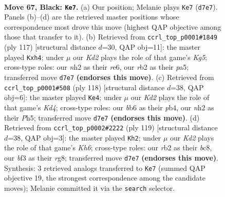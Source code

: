 \documentclass[11pt]{article}
\begin{document}
\clearpage

\begin{figure}[p]\centering
\begin{subfigure}{0.46\textwidth}\centering
\resizebox{\linewidth}{!}{%
\newchessgame
\chessboard[
  setfen={8/3k4/1B2b3/2K5/P7/1P3Brp/1R5N/8 b - - 13 67},
  showmover=false,
  pgfstyle=straightmove, color=movearrow, markmove={d7-e7}
]}
\caption{}
\end{subfigure}\hfill
\begin{subfigure}{0.46\textwidth}\centering
\resizebox{\linewidth}{!}{%
\newchessgame
\chessboard[
  setfen={8/1p6/4R3/P1K5/2P3kP/1r2Bb2/8/8 b - - 0 59},
  showmover=false,
  pgfstyle=straightmove, color=movearrow, markmove={g4-h4}
]}
\caption{}
\end{subfigure}
\\[4pt]
\begin{subfigure}{0.46\textwidth}\centering
\resizebox{\linewidth}{!}{%
\newchessgame
\chessboard[
  setfen={8/4bkp1/1R5p/4B2P/1p1K4/6P1/8/5r2 w - - 1 60},
  showmover=false,
  pgfstyle=straightmove, color=movearrow, markmove={d4-e4}
]}
\caption{}
\end{subfigure}\hfill
\begin{subfigure}{0.46\textwidth}\centering
\resizebox{\linewidth}{!}{%
\newchessgame
\chessboard[
  setfen={2B3R1/8/5p2/4b3/7p/1KP4k/1P3r2/8 b - - 1 60},
  showmover=false,
  pgfstyle=straightmove, color=movearrow, markmove={h3-h2}
]}
\caption{}
\end{subfigure}
\caption{\textbf{Move 67, Black: \texttt{Ke7}.} (a) Our position; Melanie plays \texttt{Ke7} (\texttt{d7e7}). Panels (b)--(d) are the retrieved master positions whose correspondence most drove this move (highest QAP objective among those that transfer to it). (b) Retrieved from \texttt{ccrl\_top\_p0001\#1849} (ply 117) [structural distance $d$=30, QAP obj=11]: the master played \texttt{Kxh4}; under $\mu$ our \emph{Kd2} plays the role of that game's \emph{Kg5}; cross-type roles: our \emph{n}h2 as their \emph{r}e6, our \emph{r}b2 as their \emph{p}a5; transferred move \texttt{d7e7} \textbf{(endorses this move)}. (c) Retrieved from \texttt{ccrl\_top\_p0001\#508} (ply 118) [structural distance $d$=38, QAP obj=6]: the master played \texttt{Ke4}; under $\mu$ our \emph{Kd2} plays the role of that game's \emph{Kd4}; cross-type roles: our \emph{b}b6 as their \emph{p}b4, our \emph{n}h2 as their \emph{P}h5; transferred move \texttt{d7e7} \textbf{(endorses this move)}. (d) Retrieved from \texttt{ccrl\_top\_p0002\#2222} (ply 119) [structural distance $d$=38, QAP obj=3]: the master played \texttt{Kh2}; under $\mu$ our \emph{Kd2} plays the role of that game's \emph{Kh6}; cross-type roles: our \emph{r}b2 as their \emph{b}c8, our \emph{b}f3 as their \emph{r}g8; transferred move \texttt{d7e7} \textbf{(endorses this move)}. Synthesis: 3 retrieved analogs transferred to \texttt{Ke7} (summed QAP objective 19, the strongest correspondence among the candidate moves); Melanie committed it via the \texttt{search} selector.}
\label{fig:thought-m133}
\end{figure}
\end{document}
